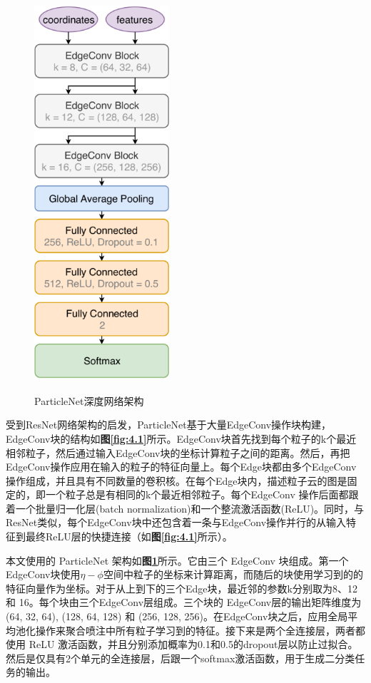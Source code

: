 \begin{figure}[H]
 \centering
 \caption{ParticleNet深度网络架构\cite{PaticleNet}}
 \includegraphics[height=14cm, width=5cm]{pictures/ParticleNet_Architecture.png}
 \label{fig:4.2}
\end{figure}

受到ResNet\cite{resnet}网络架构的启发，ParticleNet基于大量EdgeConv操作块构建，EdgeConv块的结构如\textbf{图\ref{fig:4.1}}所示。EdgeConv块首先找到每个粒子的k个最近相邻粒子，然后通过输入EdgeConv块的坐标计算粒子之间的距离。然后，再把EdgeConv操作应用在输入的粒子的特征向量上。每个Edge块都由多个EdgeConv操作组成，并且具有不同数量的卷积核。在每个Edge块内，描述粒子云的图是固定的，即一个粒子总是有相同的k个最近相邻粒子。每个EdgeConv 操作后面都跟着一个批量归一化层\cite{BatchNorm}(batch normalization)和一个整流激活函数\cite{ReLU}(ReLU)。同时，与ResNet\cite{resnet}类似，每个EdgeConv块中还包含着一条与EdgeConv操作并行的从输入特征到最终ReLU层的快捷连接（如\textbf{图\ref{fig:4.1}}所示）。


本文使用的 ParticleNet 架构如\textbf{图\ref{fig:4.2}}所示。它由三个 EdgeConv 块组成。第一个EdgeConv块使用$\eta-\phi$空间中粒子的坐标来计算距离，而随后的块使用学习到的的特征向量作为坐标。对于从上到下的三个Edge块，最近邻的参数k分别取为8、12 和 16。每个块由三个EdgeConv层组成。三个块的 EdgeConv层的输出矩阵维度为 (64, 32, 64), (128, 64, 128) 和 (256, 128, 256)。在EdgeConv块之后，应用全局平均池化操作来聚合喷注中所有粒子学习到的特征。接下来是两个全连接层，两者都使用 ReLU 激活函数，并且分别添加概率为0.1和0.5的dropout层\cite{dropout}以防止过拟合。然后是仅具有2个单元的全连接层，后跟一个softmax激活函数，用于生成二分类任务的输出。

